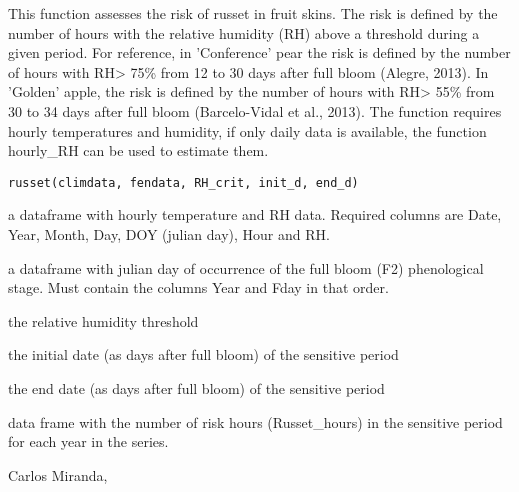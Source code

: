 \documentclass[a4paper]{book}
\begin{document}
%
\begin{Description}\relax
This function assesses the risk of russet in fruit skins. The
risk is defined by the number of hours with the relative humidity (RH)
above a threshold during a given period. For reference, in 'Conference' 
pear the risk is defined by the number of hours with RH> 75\% from 
12 to 30 days after full bloom (Alegre, 2013). In 'Golden' apple, 
the risk is defined by the number of hours with RH> 55\% from 
30 to 34 days after full bloom (Barcelo-Vidal et al., 2013). 
The function requires hourly temperatures and humidity, 
if only daily data is available, the function hourly\_RH can be 
used to estimate them.
\end{Description}
%
\begin{Usage}
\begin{verbatim}
russet(climdata, fendata, RH_crit, init_d, end_d)
\end{verbatim}
\end{Usage}
%
\begin{Arguments}
\begin{ldescription}
\item[\code{climdata}] a dataframe with hourly temperature and RH
data. Required columns are Date, Year, Month, Day, DOY (julian day),
Hour and RH.

\item[\code{fendata}] a dataframe with julian day of occurrence of the full
bloom (F2) phenological stage.
Must contain the columns Year and Fday in that order.

\item[\code{RH\_crit}] the relative humidity threshold

\item[\code{init\_d}] the initial date (as days after full bloom) of the sensitive period

\item[\code{end\_d}] the end date (as days after full bloom) of the sensitive period
\end{ldescription}
\end{Arguments}
%
\begin{Value}
data frame with the number of risk hours (Russet\_hours)
in the sensitive period for each year in the series.
\end{Value}
%
\begin{Author}\relax
Carlos Miranda, 
\end{Author}
\end{document}
